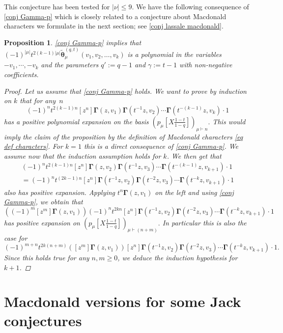 \documentclass[12pt]{amsart}
\newtheorem{prop}[thm]{Proposition}
\theoremstyle{remark}
\newcommand{\Mch}{\boldsymbol{\widetilde\theta}^{(q,t)}}
\newcommand{\GammaJ}{\boldsymbol{\Gamma}}
\begin{document}
This conjecture has been tested for $|\nu|\leq 9$. 
We have the following consequence of \cref{conj Gamma-p} which is closely related to a conjecture about Macdonald characters we formulate in the next section; see \cref{conj lassale macdonald}.
\begin{prop}
    \cref{conj Gamma-p} implies that $(-1)^{|\mu|}t^{2(k-1)|\mu|}\Mch_\mu(v_1,v_2,\dots,v_k)$ is a polynomial in the variables $-v_1,\cdots,-v_k$ and the parameters $q':=q-1$ and $\gamma:=t-1$ with non-negative coefficients.

    \begin{proof}
    Let us assume that \cref{conj Gamma-p} holds.
        We want to prove by induction on $k$ that for any~$n$
        $$(-1)^nt^{2(k-1)n}[z^n]\GammaJ(z,v_1)\GammaJ(t^{-1}z,v_2)\cdots \GammaJ(t^{-(k-1)}z,v_k)\cdot1$$ has 
        a positive polynomial expansion on the basis $\left(p_\mu\left[X\frac{1-t}{1-q}\right]\right)_{\mu\vdash n}.$
This would imply the claim of the proposition by the definition of Macdonald characters \cref{eq def characters}.       
    For $k=1$ this is a direct consequence of \cref{conj Gamma-p}. We assume now that the induction assumption holds for $k$. We then get that
    \begin{multline*}
      (-1)^n t^{2(k-1)n}[z^n]\GammaJ(z,v_2)\GammaJ(t^{-1}z,v_3)\cdots \GammaJ(t^{-(k-1)}z,v_{k+1})\cdot1\\  
      =(-1)^n t^{(2k-1)n}[z^n]\GammaJ(t^{-1}z,v_2)\GammaJ(t^{-2}z,v_3)\cdots \GammaJ(t^{-k}z,v_{k+1})\cdot1
    \end{multline*}
    also has positive expansion.  Applying $t^n\GammaJ(z,v_1)$ on the left and using \cref{conj Gamma-p}, we obtain that 
    $$\left((-1)^m[z^m]\GammaJ(z,v_1)\right)(-1)^nt^{2kn}[z^n]\GammaJ(t^{-1}z,v_2)\GammaJ(t^{-2}z,v_3)\cdots \GammaJ(t^{-k}z,v_{k+1})\cdot1$$
    has positive expansion on $\left(p_\mu\left[X\frac{1-t}{1-q}\right]\right)_{\mu\vdash (n+m)}.$
    In particular this is also the case for 
    $$(-1)^{m+n}t^{2k(n+m)}\left([z^m]\GammaJ(z,v_1)\right)[z^n]\GammaJ(t^{-1}z,v_2)\GammaJ(t^{-2}z,v_3)\cdots \GammaJ(t^{-k}z,v_{k+1})\cdot1.$$
    Since this holds true for any $n,m\geq 0$, we deduce the induction hypothesis for $k+1$.
    \end{proof}
\end{prop}

\section{Macdonald versions for some Jack conjectures}\label{sec:generalized conjectures}
\end{document}
